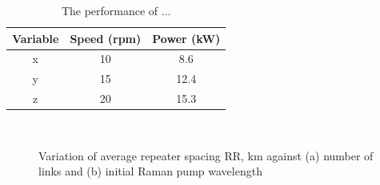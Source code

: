 \documentclass{iaesarticle}
\begin{document}
\begin{table}[H]
\centering
\fontsize{8pt}{10pt}\selectfont
\caption{The performance of ...}
\begin{tabular}{ccc}
\hline
Variable & Speed (rpm) & Power (kW) \\
\hline
x & 10 & 8.6 \\
y & 15 & 12.4 \\
z & 20 & 15.3 \\
\hline
\end{tabular}
\end{table}

\begin{figure}[H]
	\centering
	\\
	\vspace{.7em}
	\caption{Variation of average repeater spacing RR, km against (a) number of links and 
		(b) initial Raman pump wavelength}
\end{figure}
\end{document}
